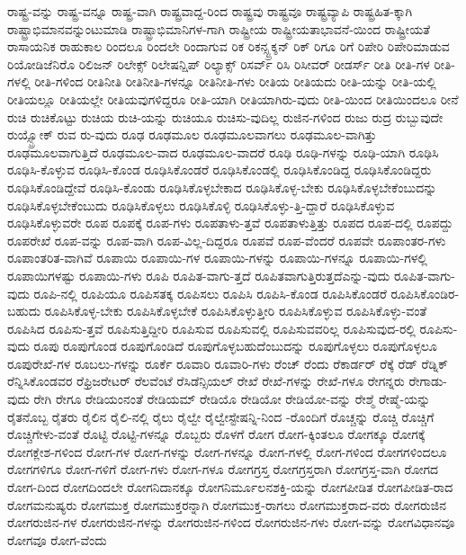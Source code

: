 {ರಾಷ್ಟ್ರ-ವನ್ನು
ರಾಷ್ಟ್ರ-ವನ್ನೂ
ರಾಷ್ಟ್ರ-ವಾಗಿ
ರಾಷ್ಟ್ರವಾದ್ದ-ರಿಂದ
ರಾಷ್ಟ್ರವು
ರಾಷ್ಟ್ರವೂ
ರಾಷ್ಟ್ರವ್ಯಾಪಿ
ರಾಷ್ಟ್ರಹಿತ-ಕ್ಕಾಗಿ
ರಾಷ್ಟ್ರಾಭಿಮಾನವನ್ನುಂಟುಮಾಡಿ
ರಾಷ್ಟ್ರಾಭಿಮಾನಿಗಳ-ಗಾಗಿ
ರಾಷ್ಟ್ರೀಯ
ರಾಷ್ಟ್ರೀಯತಾಭಾವನೆ-ಯಿಂದ
ರಾಷ್ಟ್ರೀಯತೆ
ರಾಸಾಯನಿಕ
ರಾಹುಕಾಲ
ರಿಂದಲೂ
ರಿಂದಲೇ
ರಿಂದಾಗುವ
ರಿಕ
ರಿಕನ್ಸ್ಟ್ರಕ್ಶನ್
ರಿಕ್
ರಿಗೂ
ರಿಗೆ
ರಿಪೇರಿ
ರಿಪೇರಿಮಾಡುವ
ರಿಯೋಡಿಜೆನಿರೊ
ರಿಲಿಜನ್
ರಿಲೇಕ್ಸ್
ರಿಲೇಷನ್ಷಿಪ್
ರಿಲ್ಯಾಕ್ಸ್
ರಿಸರ್ವ್
ರಿಸಿ
ರಿಸೀವರ್
ರೀಡರ್ಸ್
ರೀತಿ
ರೀತಿ-ಗಳ
ರೀತಿ-ಗಳಲ್ಲಿ
ರೀತಿ-ಗಳಿಂದ
ರೀತಿನೀತಿ
ರೀತಿನೀತಿ-ಗಳನ್ನೂ
ರೀತಿನೀತಿ-ಗಳು
ರೀತಿಯ
ರೀತಿಯದು
ರೀತಿ-ಯನ್ನು
ರೀತಿ-ಯಲ್ಲಿ
ರೀತಿಯಲ್ಲೂ
ರೀತಿಯಲ್ಲೇ
ರೀತಿಯವುಗಳಿದ್ದರೂ
ರೀತಿ-ಯಾಗಿ
ರೀತಿಯಾಗಿರು-ವುದು
ರೀತಿ-ಯಿಂದ
ರೀತಿಯಿಂದಲೂ
ರೀನೆ
ರುಚಿ
ರುಚಿಕೊಟ್ಟು
ರುಚಿಯ
ರುಚಿ-ಯನ್ನು
ರುಚಿಯೂ
ರುಚಿಸು-ವುದಿಲ್ಲ
ರುಜಿನ-ಗಳಿಂದ
ರುಜು
ರುದ್ರ
ರುಬ್ಬುವುದೇ
ರುಯ್ಸ್ಬ್ರೋಕ್
ರುವ
ರು-ವುದು
ರೂಢ
ರೂಢಮೂಲ
ರೂಢಮೂಲವಾಗಲು
ರೂಢಮೂಲ-ವಾಗಿತ್ತು
ರೂಢಮೂಲವಾಗುತ್ತಿದೆ
ರೂಢಮೂಲ-ವಾದ
ರೂಢಮೂಲ-ವಾದರೆ
ರೂಢಿ
ರೂಢಿ-ಗಳನ್ನು
ರೂಢಿ-ಯಾಗಿ
ರೂಢಿಸಿ
ರೂಢಿಸಿ-ಕೊಳ್ಳುವ
ರೂಢಿಸಿ-ಕೊಂಡ
ರೂಢಿಸಿಕೊಂಡರೆ
ರೂಢಿಸಿಕೊಂಡಲ್ಲಿ
ರೂಢಿಸಿಕೊಂಡಿದ್ದ
ರೂಢಿಸಿಕೊಂಡಿದ್ದರು
ರೂಢಿಸಿಕೊಂಡಿದ್ದೇವೆ
ರೂಢಿಸಿ-ಕೊಂಡು
ರೂಢಿಸಿಕೊಳ್ಳಬೇಕಾದ
ರೂಢಿಸಿಕೊಳ್ಳ-ಬೇಕು
ರೂಢಿಸಿಕೊಳ್ಳಬೇಕೆಂಬುದನ್ನು
ರೂಢಿಸಿಕೊಳ್ಳಬೇಕೆಂಬುದು
ರೂಢಿಸಿಕೊಳ್ಳಲು
ರೂಢಿಸಿಕೊಳ್ಳಿ
ರೂಢಿಸಿಕೊಳ್ಳು-ತ್ತಿ-ದ್ದಾರೆ
ರೂಢಿಸಿಕೊಳ್ಳುವ
ರೂಢಿಸಿಕೊಳ್ಳುವರೇ
ರೂಪ
ರೂಪಕ್ಕೆ
ರೂಪ-ಗಳು
ರೂಪತಾಳು-ತ್ತವೆ
ರೂಪತಾಳುತ್ತಿತ್ತು
ರೂಪದ
ರೂಪ-ದಲ್ಲಿ
ರೂಪದ್ದು
ರೂಪರೇಖೆ
ರೂಪ-ವನ್ನು
ರೂಪ-ವಾಗಿ
ರೂಪ-ವಿಲ್ಲ-ದಿದ್ದರೂ
ರೂಪವೆ
ರೂಪ-ವೆಂದರೆ
ರೂಪವೇ
ರೂಪಾಂತರ-ಗಳು
ರೂಪಾಂತರಿತ-ವಾಗಿವೆ
ರೂಪಾಯಿ
ರೂಪಾಯಿ-ಗಳ
ರೂಪಾಯಿ-ಗಳನ್ನು
ರೂಪಾಯಿ-ಗಳನ್ನೂ
ರೂಪಾಯಿ-ಗಳಲ್ಲಿ
ರೂಪಾಯಿಗಳಷ್ಟು
ರೂಪಾಯಿ-ಗಳು
ರೂಪಿ
ರೂಪಿತ-ವಾಗು-ತ್ತದೆ
ರೂಪಿತವಾಗುತ್ತಿರುತ್ತದೆಎನ್ನು-ವುದು
ರೂಪಿತ-ವಾಗು-ವುದು
ರೂಪಿ-ನಲ್ಲಿ
ರೂಪಿಯೂ
ರೂಪಿಸತಕ್ಕ
ರೂಪಿಸಲು
ರೂಪಿಸಿ
ರೂಪಿಸಿ-ಕೊಂಡ
ರೂಪಿಸಿಕೊಂಡರೆ
ರೂಪಿಸಿಕೊಂಡಿರ-ಬಹುದು
ರೂಪಿಸಿಕೊಳ್ಳ-ಬೇಕು
ರೂಪಿಸಿಕೊಳ್ಳಬೇಕೆ
ರೂಪಿಸಿಕೊಳ್ಳುತ್ತೀರಿ
ರೂಪಿಸಿಕೊಳ್ಳುವ
ರೂಪಿಸಿಕೊಳ್ಳು-ವಂತೆ
ರೂಪಿಸಿದ
ರೂಪಿಸು-ತ್ತವೆ
ರೂಪಿಸುತ್ತಿದ್ದೀರಿ
ರೂಪಿಸುವ
ರೂಪಿಸುವಲ್ಲಿ
ರೂಪಿಸುವವರಿಲ್ಲ
ರೂಪಿಸುವುದ-ರಲ್ಲಿ
ರೂಪಿಸು-ವುದು
ರೂಪು
ರೂಪುಗೊಂಡ
ರೂಪುಗೊಂಡಿದೆ
ರೂಪುಗೊಳ್ಳಬಹುದೆಂಬುದನ್ನು
ರೂಪುಗೊಳ್ಳಲು
ರೂಪುಗೊಳ್ಳಲೂ
ರೂಪುರೇಖೆ-ಗಳ
ರೂಬಲು-ಗಳನ್ನು
ರೂರ್ಕೆ
ರೂವಾರಿ
ರೂವಾರಿ-ಗಳು
ರೆಂಚ್
ರೆಂದು
ರೆಕಾರ್ಡರ್
ರೆಕ್ಕೆ
ರೆಡ್
ರೆಡ್ನಿಕ್
ರೆನ್ನಿಸಿಕೊಂಡವರ
ರೆಫ್ರಿಜರೇಟರ್
ರೆಲವೆಂಟೆ
ರೆಸಿಡೆನ್ಸಿಯಲ್
ರೇಖೆ
ರೇಖೆ-ಗಳನ್ನು
ರೇಖೆ-ಗಳೂ
ರೇಗನ್ನರು
ರೇಗಾಡು-ವುದು
ರೇಗಿ
ರೇಗೂ
ರೇಡಿಯಂನಂತೆ
ರೇಡಿಯಮ್
ರೇಡಿಯೊ
ರೇಡಿಯೋ
ರೇಡಿಯೋ-ವನ್ನು
ರೇಶ್ಮೆ
ರೇಷ್ಮೆ-ಯನ್ನು
ರೈತನೊಬ್ಬ
ರೈತರು
ರೈಲಿನ
ರೈಲಿ-ನಲ್ಲಿ
ರೈಲು
ರೈಲ್ವೇ
ರೈಲ್ವೇಸ್ಟೇಷನ್ನಿ-ನಿಂದ
-ರೊಂದಿಗೆ
ರೊಚ್ಚನ್ನು
ರೊಚ್ಚಿ
ರೊಚ್ಚಿಗೆ
ರೊಚ್ಚಿಗೇಳು-ವಂತೆ
ರೊಟ್ಟಿ
ರೊಟ್ಟಿ-ಗಳನ್ನೂ
ರೊಬ್ಬರು
ರೊಳಗೆ
ರೋಗ
ರೋಗ-ಕ್ಕಿಂತಲೂ
ರೋಗಕ್ಕೂ
ರೋಗಕ್ಕೆ
ರೋಗಕ್ಲೇಶ-ಗಳಿಂದ
ರೋಗ-ಗಳ
ರೋಗ-ಗಳನ್ನು
ರೋಗ-ಗಳನ್ನೂ
ರೋಗ-ಗಳಲ್ಲಿ
ರೋಗ-ಗಳಿಂದ
ರೋಗಗಳಿಂದಲೂ
ರೋಗಗಳಿಗೂ
ರೋಗ-ಗಳಿಗೆ
ರೋಗ-ಗಳು
ರೋಗ-ಗಳೂ
ರೋಗಗ್ರಸ್ತ
ರೋಗಗ್ರಸ್ತರಾಗಿ
ರೋಗಗ್ರಸ್ತ-ವಾಗಿ
ರೋಗದ
ರೋಗ-ದಿಂದ
ರೋಗದಿಂದಲೇ
ರೋಗನಿದಾನಕ್ಕೂ
ರೋಗನಿರ್ಮೂಲನಶಕ್ತಿ-ಯನ್ನು
ರೋಗಪೀಡಿತ
ರೋಗಪೀಡಿತ-ರಾದ
ರೋಗಮನುಷ್ಯರು
ರೋಗಮುಕ್ತ
ರೋಗಮುಕ್ತರನ್ನಾಗಿ
ರೋಗಮುಕ್ತ-ರಾಗಲು
ರೋಗಮುಕ್ತರಾದ-ವರು
ರೋಗರುಜಿನ
ರೋಗರುಜಿನ-ಗಳ
ರೋಗರುಜಿನ-ಗಳನ್ನು
ರೋಗರುಜಿನ-ಗಳಿಂದ
ರೋಗರುಜಿನ-ಗಳು
ರೋಗ-ವನ್ನು
ರೋಗವಿಧಾನವೂ
ರೋಗವೂ
ರೋಗ-ವೆಂದು
}
